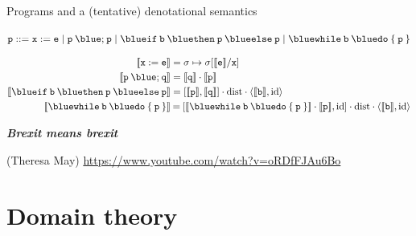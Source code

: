 \documentclass{beamer}
\begin{document}
\begin{frame}{Programs and a (tentative) denotational semantics}
        \begin{block}{\vspace*{-3.5ex}}
        \begin{center}
        $\prog{p} ::= \mathtt{x} := \mathtt{e} \mid
	\mathtt{p \> {\blue ;} \> p} \mid
	\mathtt{{\blue if} \> b \> {\blue then} \> p \> {\blue else} \> p} \mid
	\mathtt{{\blue while} \> b \> {\blue do} \> \{ \> p \> \}}$
        \end{center}
	\end{block}
        \vspace{-0.5cm}
        \begin{align*}
                \sem{\prog{x : = e}} & = \sigma \mapsto \sigma[\sem{\prog{e}}/\prog{x}] \\
                \sem{\prog{p} \> {\blue ;} \> \prog{q}} & 
                = \sem{\prog{q}} \comp \sem{\prog{p}} \\
                \sem{\mathtt{{\blue if} \> b \> {\blue then} \> p \> {\blue else} \> p}}
                                                        & 
                                                        = [\sem{\prog{p}},\sem{\prog{q}}] \comp
                                                        \mathrm{dist} \comp \pv{\sem{\prog{b}}}{\id}
                \\
                \sem{\mathtt{{\blue while} \> b \> {\blue do} \> \{ \> p \> \}} }
                                                        & \> {=} \>
                [\sem{\mathtt{{\blue while} \> b \> {\blue do} \> \{ \> p \> \}} } \comp 
                \sem{\prog{p}},\id] \comp
                \mathrm{dist} \comp \pv{\sem{\prog{b}}}{\id}
        \end{align*}

        \pause
        \begin{flushright}
        \emph{\textbf{Brexit means brexit}}


        \scriptsize{(Theresa May) \url{https://www.youtube.com/watch?v=oRDfFJAu6Bo}}
        \end{flushright}

\end{frame}

\section{Domain theory}



\end{document}
